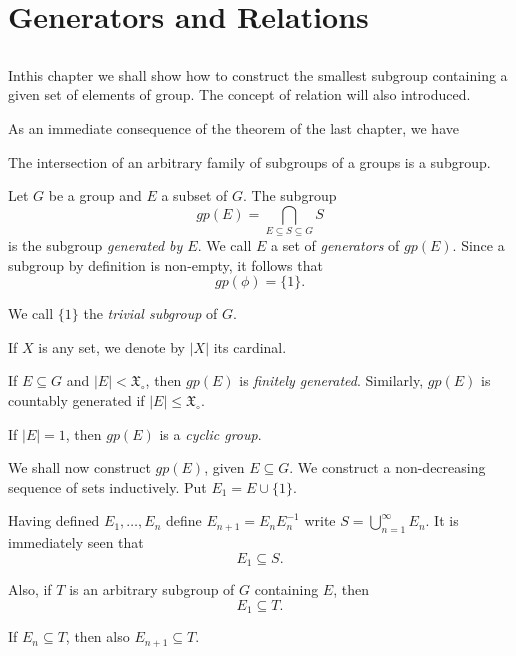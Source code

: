
\chapter{Generators and Relations}\label{chap2} %

\section{}\label{chap2:sec1} %

In\pageoriginale this chapter we shall show how to construct the smallest subgroup
containing a given set of elements of group. The concept of relation
will also introduced.  

As an immediate consequence of the theorem of the last
chapter, we have 

\setcounter{theorem}{0}
\begin{theorem}\label{chap2:sec1:thm1} %
  The intersection of an arbitrary family of subgroups of a groups is
  a subgroup. 
\end{theorem} 
 
 Let $G$ be a group and $E$ a subset of $G$. The subgroup
 $$
 gp (E) = \bigcap_{E \subseteq S \subseteq G}S
 $$
 is the subgroup \textit{generated by $E$}. We call $E$ a set of
 \textit {generators} of $gp (E)$. Since a subgroup by definition is
 non-empty, it follows that 
 $$
 gp (\phi) = \{1 \}.
 $$ 
 
 We call $\{1 \}$ the \textit{trivial subgroup} of $G$.
 
 If $X$ is any set, we denote by $|X|$ its cardinal.
 
 If $E \subseteq G$ and $|E| < \mathfrak{X}_\circ$, then $gp(E)$ is
 \textit{finitely generated}. Similarly, $gp(E)$ is countably
 generated if $|E| \leq \mathfrak{X}_\circ$. 
 
 If $|E| = 1$, then $gp(E)$ is a \textit{cyclic group}.
 
 We shall now construct $gp(E)$, given $E \subseteq G$. We construct a\pageoriginale
 non-decreasing sequence of sets inductively. Put $E_1 = E \cup
 \{1\}$. 

 Having defined $E_1, \ldots, E_n$ define $E_{n+1} = E_n E^{-1}_{n}$
 write $S = \bigcup\limits_{n=1}^{\infty} E_n$. It is immediately seen
 that 
 $$
 E_1 \subseteq S. 
 $$
 
 Also, if $T$ is an arbitrary subgroup of $G$ containing $E$, then 
 $$
 E_1 \subseteq T. 
 $$
 
 If $E_{n}  \subseteq T$, then also $E_{n+1} \subseteq T$.
 
